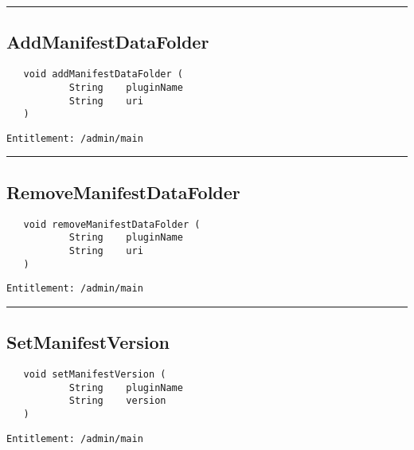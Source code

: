 \rule{12cm}{2pt}
\subsection{AddManifestDataFolder}
\label{Api:AddManifestDataFolder}
\begin{verbatim}
   void addManifestDataFolder (
           String    pluginName
           String    uri
   )
\end{verbatim}
\begin{Verbatim}[fontsize=\small, formatcom=\color{Maroon}]
  Entitlement: /admin/main
\end{Verbatim}



\rule{12cm}{2pt}
\subsection{RemoveManifestDataFolder}
\label{Api:RemoveManifestDataFolder}
\begin{verbatim}
   void removeManifestDataFolder (
           String    pluginName
           String    uri
   )
\end{verbatim}
\begin{Verbatim}[fontsize=\small, formatcom=\color{Maroon}]
  Entitlement: /admin/main
\end{Verbatim}



\rule{12cm}{2pt}
\subsection{SetManifestVersion}
\label{Api:SetManifestVersion}
\begin{verbatim}
   void setManifestVersion (
           String    pluginName
           String    version
   )
\end{verbatim}
\begin{Verbatim}[fontsize=\small, formatcom=\color{Maroon}]
  Entitlement: /admin/main
\end{Verbatim}



